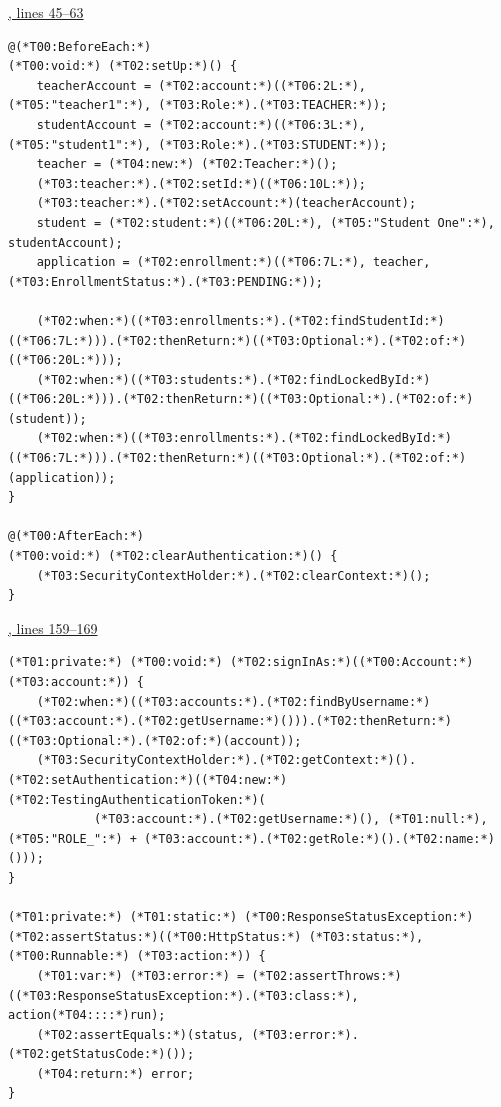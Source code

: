 \par\smallskip
{\small\href{\repo/blob/5d22aed7f6d4ef1e4c0b0c0dabf2962ba4b47608/src/test/java/com/example/fmschool/EnrollmentServiceUnitTests.java#L45-L63}{, lines 45--63}}
\begin{lstlisting}[style=vsJava,firstnumber=45]
@(*T00:BeforeEach:*)
(*T00:void:*) (*T02:setUp:*)() {
    teacherAccount = (*T02:account:*)((*T06:2L:*), (*T05:"teacher1":*), (*T03:Role:*).(*T03:TEACHER:*));
    studentAccount = (*T02:account:*)((*T06:3L:*), (*T05:"student1":*), (*T03:Role:*).(*T03:STUDENT:*));
    teacher = (*T04:new:*) (*T02:Teacher:*)();
    (*T03:teacher:*).(*T02:setId:*)((*T06:10L:*));
    (*T03:teacher:*).(*T02:setAccount:*)(teacherAccount);
    student = (*T02:student:*)((*T06:20L:*), (*T05:"Student One":*), studentAccount);
    application = (*T02:enrollment:*)((*T06:7L:*), teacher, (*T03:EnrollmentStatus:*).(*T03:PENDING:*));

    (*T02:when:*)((*T03:enrollments:*).(*T02:findStudentId:*)((*T06:7L:*))).(*T02:thenReturn:*)((*T03:Optional:*).(*T02:of:*)((*T06:20L:*)));
    (*T02:when:*)((*T03:students:*).(*T02:findLockedById:*)((*T06:20L:*))).(*T02:thenReturn:*)((*T03:Optional:*).(*T02:of:*)(student));
    (*T02:when:*)((*T03:enrollments:*).(*T02:findLockedById:*)((*T06:7L:*))).(*T02:thenReturn:*)((*T03:Optional:*).(*T02:of:*)(application));
}

@(*T00:AfterEach:*)
(*T00:void:*) (*T02:clearAuthentication:*)() {
    (*T03:SecurityContextHolder:*).(*T02:clearContext:*)();
}
\end{lstlisting}

\par\smallskip
{\small\href{\repo/blob/5d22aed7f6d4ef1e4c0b0c0dabf2962ba4b47608/src/test/java/com/example/fmschool/EnrollmentServiceUnitTests.java#L159-L169}{, lines 159--169}}
\begin{lstlisting}[style=vsJava,firstnumber=159]
(*T01:private:*) (*T00:void:*) (*T02:signInAs:*)((*T00:Account:*) (*T03:account:*)) {
    (*T02:when:*)((*T03:accounts:*).(*T02:findByUsername:*)((*T03:account:*).(*T02:getUsername:*)())).(*T02:thenReturn:*)((*T03:Optional:*).(*T02:of:*)(account));
    (*T03:SecurityContextHolder:*).(*T02:getContext:*)().(*T02:setAuthentication:*)((*T04:new:*) (*T02:TestingAuthenticationToken:*)(
            (*T03:account:*).(*T02:getUsername:*)(), (*T01:null:*), (*T05:"ROLE_":*) + (*T03:account:*).(*T02:getRole:*)().(*T02:name:*)()));
}

(*T01:private:*) (*T01:static:*) (*T00:ResponseStatusException:*) (*T02:assertStatus:*)((*T00:HttpStatus:*) (*T03:status:*), (*T00:Runnable:*) (*T03:action:*)) {
    (*T01:var:*) (*T03:error:*) = (*T02:assertThrows:*)((*T03:ResponseStatusException:*).(*T03:class:*), action(*T04::::*)run);
    (*T02:assertEquals:*)(status, (*T03:error:*).(*T02:getStatusCode:*)());
    (*T04:return:*) error;
}
\end{lstlisting}


